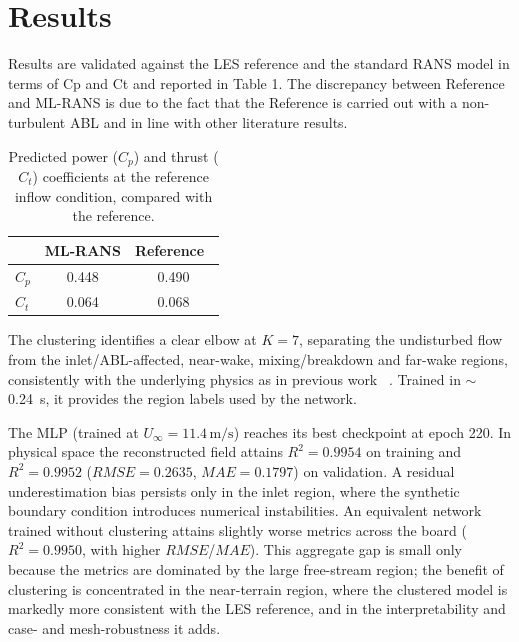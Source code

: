 \documentclass[12pt,a4paper]{article}
\begin{document}
\section{Results}
\label{sec:results}
Results are validated against the LES reference and the standard RANS model in terms of Cp and Ct and reported in Table 1.
The discrepancy between Reference and ML-RANS is due to the fact that the Reference is carried out with a 
non-turbulent ABL and in line with other literature results.

\begin{table}[H]
    \centering
    \begin{tabular}{l c c}
        \hline
         & ML-RANS & Reference~\cite{NREL_5MW} \\
        \hline
        $C_p$ & 0.448 & 0.490 \\
        $C_t$ & 0.064 & 0.068 \\
        \hline
    \end{tabular}
    \caption{Predicted power ($C_p$) and thrust ($C_t$) coefficients at the reference
    inflow condition, compared with the reference.}
    \label{tab:forces_coeff}
\end{table}

The clustering identifies a clear elbow at $K=7$, separating the undisturbed flow from the
inlet/ABL-affected, near-wake, mixing/breakdown and far-wake regions, consistently with
the underlying physics as in previous work ~\cite{Carloni2026}. Trained in $\sim$0.24~s,
it provides the region labels used by the network.

The MLP (trained at $U_\infty = 11.4\,\mathrm{m/s}$) reaches its best checkpoint at epoch
220. In physical space the reconstructed field attains $R^2 = 0.9954$ on training and $R^2
= 0.9952$ ($RMSE = 0.2635$, $MAE = 0.1797$) on validation. A residual underestimation bias
persists only in the inlet region, where the synthetic boundary condition introduces
numerical instabilities. An equivalent network trained without clustering attains slightly
worse metrics across the board ($R^2 = 0.9950$, with higher $RMSE$/$MAE$). This aggregate
gap is small only because the metrics are dominated by the large free-stream region; the
benefit of clustering is concentrated in the near-terrain region, where the clustered
model is markedly more consistent with the LES reference, and in the interpretability and
case- and mesh-robustness it adds.
\end{document}
